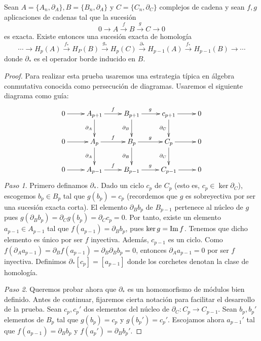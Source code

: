 \begin{lema}
	\label{lem:zig-zag}
	Sean $A = \{A_n,\partial_A\}, B = \{B_n,\partial_A\}$ y $C = \{C_n,\partial_C\}$ complejos de cadena y sean $f,g$ aplicaciones de cadenas tal que la sucesión
	\[
		0 \to A \overset{f}{\to} B \overset{g}{\to} C \to 0
	\]
	es exacta. Existe entonces una sucesión exacta de homología
	\begin{equation}
		\label{eq:long-exact-hom}
	\cdots \to H_p(A) \overset{f_*}{\to} H_P(B) \overset{g_*}{\to} H_p(C) \overset{\partial_*}{\to} H_{p-1}(A) \overset{f_*}{\to} H_{p-1}(B) \to \cdots
	\end{equation}
	donde $\partial_*$ es el operador borde inducido en $B$.
\end{lema}
\begin{proof}
	Para realizar esta prueba usaremos una estrategia típica en álgebra conmutativa conocida como persecución de diagramas. Usaremos el siguiente diagrama como guía:
	\[
		\xymatrix{
			0 \ar@{->}[r] & A_{p+1} \ar@{->}[r]^{f} \ar@{->}[d]_{\partial_A} & B_{p+1} \ar@{->}[r]^{g} \ar@{->}[d]_{\partial_B} & c_{p+1} \ar@{->}[r] \ar@{->}[d]_{\partial_C} & 0 \\
			0 \ar@{->}[r] & A_p \ar@{->}[r]^{f} \ar@{->}[d]_{\partial_A} & B_p \ar@{->}[r]^{g} \ar@{->}[d]_{\partial_B} & C_p \ar@{->}[r] \ar@{->}[d]_{\partial_C} & 0 \\
			0 \ar@{->}[r] & A_{p-1} \ar@{->}[r]^{f} & B_{p-1} \ar@{->}[r]^{g} & C_{p-1} \ar@{->}[r] & 0
		}
	\]
	\textit{Paso 1}. Primero definamos $\partial_*$. Dado un ciclo $c_p$ de $C_p$ (esto es, $c_p \in \ker \partial_C$), escogemos $b_p \in B_p$ tal que $g(b_p) = c_p$ (recordemos que $g$ es sobreyectiva por ser una sucesión exacta corta). El elemento $\partial_B b_p$ de $B_{p-1}$ pertenece al núcleo de $g$ pues $g(\partial_B b_p)=\partial_C g(b_p)=\partial_C c_p=0$. Por tanto, existe un elemento $a_{p-1} \in A_{p-1}$ tal que $f(a_{p-1})=\partial_B b_p$, pues $\ker g = \operatorname{Im} f$. Tenemos que dicho elemento es único por ser $f$ inyectiva. Además, $c_{p-1}$ es un ciclo. Como $f(\partial_A a_{p-1}) = \partial_B f(a_{p-1}) = \partial_B \partial_B b_p = 0$, entonces $\partial_A a_{p-1} = 0$ por ser $f$ inyectiva. Definimos $\partial_*[c_p] = [a_{p-1}]$ donde los corchetes denotan la clase de homología.
	
	\textit{Paso 2}. Queremos probar ahora que $\partial_*$ es un homomorfismo de módulos bien definido. Antes de continuar, fijaremos cierta notación para facilitar el desarrollo de la prueba. Sean $c_p, c_p'$ dos elementos del núcleo de $\partial_C: C_p \to C_{p-1}$. Sean $b_p, b_p'$ elementos de $B_p$ tal que $g(b_p) = c_p$ y $g(b_p')=c_p'$. Escojamos ahora $a_{p-1}'$ tal que $f(a_{p-1}) = \partial_B b_p$ y $f(a_p') = \partial_B b_p'$.
	

\end{proof}
